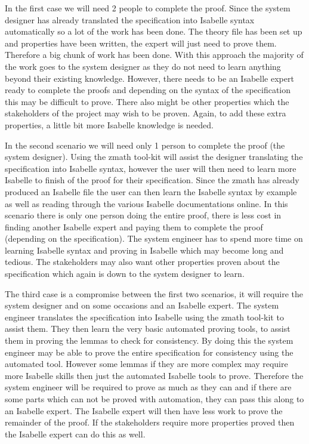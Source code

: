 In the first case we will need 2 people to complete the proof. Since the system
designer has already translated the specification into Isabelle syntax
automatically so a lot of the work has been done. The theory file has been set
up and properties have been written, the expert will just need to prove them.
Therefore a big chunk of work has been done. With this approach the majority of
the work goes 
to the system designer as they do not need to learn anything beyond their
existing knowledge. However, there
needs to be an Isabelle expert ready to complete the proofs and depending on the
syntax of the specification this may be difficult to prove. There also might be
other properties which the stakeholders of the project may wish to be proven.
Again, to add these extra properties, a little bit more Isabelle knowledge is
needed.

In the second scenario we will need only 1 person to complete the proof (the
system designer). Using the \gls{zmath} tool-kit will assist the designer
translating the specification into Isabelle syntax, however the user will then
need to learn more Isabelle to finish of the proof for their specification.
Since the \gls{zmath} has already produced an Isabelle file the user can then
learn the Isabelle syntax by example as well as reading through the various
Isabelle documentations online. In this scenario 
there is only one person doing the entire proof, there is less cost in finding
another Isabelle expert and paying them to complete the proof (depending on
the specification). The system engineer has to spend more time on learning
Isabelle syntax and proving in Isabelle which may become long and tedious. The
stakeholders may also want other properties proven about the specification which
again is down to the system designer to learn.

The third case is a compromise between the first two scenarios, it will require
the system designer and on some occasions and an Isabelle expert. The system
engineer translates the specification into Isabelle using the \gls{zmath}
tool-kit to assist them. They then learn the very basic automated proving tools,
to assist them in proving the lemmas to check for consistency. By doing this the
system engineer may be able to prove the entire specification for consistency
using the automated tool. However some lemmas if they are more complex may
require more Isabelle skills then just the automated Isabelle tools to prove.
Therefore the system engineer will be required to prove as much as they can and
if there are some parts which can not be proved with automation, they can pass
this along to an Isabelle expert. The Isabelle expert will then have less work
to prove the remainder of the proof. If the stakeholders require more properties
proved then the Isabelle expert can do this as well.

